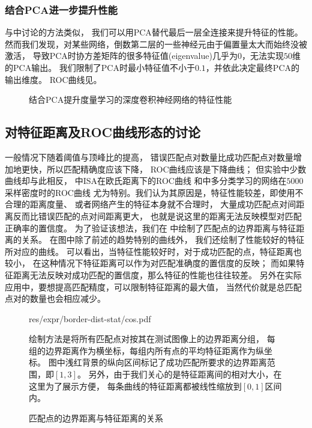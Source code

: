 \subsubsection{结合PCA进一步提升性能}
与中讨论的方法类似，
我们可以用PCA替代最后一层全连接来提升特征的性能。
然而我们发现，对某些网络，倒数第二层的一些神经元由于偏置量太大而始终没被激活，
导致PCA时协方差矩阵的很多特征值(eigenvalue)几乎为$0$，无法实现$50$维的PCA输出。
我们限制了PCA时最小特征值不小于$0.1$，并依此决定最终PCA的输出维度。
ROC曲线见。
\begin{figure}[h!]
    \caption{结合PCA提升度量学习的深度卷积神经网络的特征性能}
    \label{fig:expr:curve:mtrc:pca}
\end{figure}

\subsection{对特征距离及ROC曲线形态的讨论}
一般情况下随着阈值与顶峰比的提高，
错误匹配点对数量比成功匹配点对数量增加地更快，所以匹配精确度应该下降，
ROC曲线应该是下降曲线；
但实验中少数曲线却与此相反，
中ISA在欧氏距离下的ROC曲线
和中多分类学习的网络在$5000$采样密度时的ROC曲线
尤为特别。我们认为其原因是，特征性能较差，即使用不合理的距离度量、
或者网络产生的特征本身就不合理时，
大量成功匹配点对间距离反而比错误匹配的点对间距离更大，
也就是说这里的距离无法反映模型对匹配正确率的置信度。
为了验证该想法，我们在
中绘制了匹配点的边界距离与特征距离的关系。
在图中除了前述的趋势特别的曲线外，
我们还绘制了性能较好的特征所对应的曲线。
可以看出，当特征性能较好时，对于成功匹配的点，特征距离也较小，
在这种情况下特征距离可以作为对匹配准确度的置信度的反映；
而如果特征距离无法反映对成功匹配的置信度，那么特征的性能也往往较差。
另外在实际应用中，要想提高匹配精度，可以限制特征距离的最大值，
当然代价就是总匹配点对的数量也会相应减少。

\begin{figure}[h!]
    {
            {res/expr/border-dist-stat/cos.pdf}
        \caption{匹配点的边界距离与特征距离的关系}
        \label{fig:expr:curve:border-dist-stat}
    }
    \footnotesize
    绘制方法是将所有匹配点对按其在测试图像上的边界距离分组，
    每组的边界距离作为横坐标，每组内所有点的平均特征距离作为纵坐标。
    图中浅红背景的纵向区间标记了成功匹配所要求的边界距离范围，即$[1, 3]$。
    另外，由于我们关心的是特征距离间的相对大小，在这里为了展示方便，
    每条曲线的特征距离都被线性缩放到$[0, 1]$区间内。
\end{figure}


